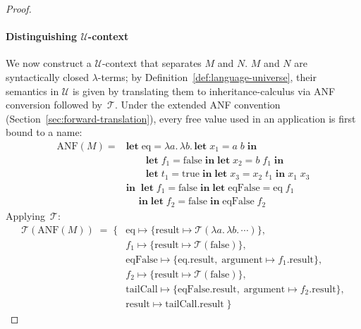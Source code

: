 \begin{proof}
  \paragraph{Distinguishing $\mathscr{U}$-context}
  We now construct a $\mathscr{U}$-context that
  separates $M$ and $N$.
  $M$ and $N$ are syntactically closed $\lambda$-terms;
  by Definition~\ref{def:language-universe}, their
  semantics in $\mathscr{U}$ is given by translating
  them to inheritance-calculus via ANF conversion followed
  by~$\mathcal{T}$.
  Under the extended ANF convention
  (Section~\ref{sec:forward-translation}), every free
  value used in an application is first bound to a name:
  \begin{align*}
    \mathrm{ANF}(M) ={} &
    \mathbf{let}\;\mathrm{eq} =
    \lambda a.\,\lambda b.\,
    \mathbf{let}\; x_1 = a\;b \;\mathbf{in}\; \\
    &\qquad
    \mathbf{let}\; f_1 = \mathrm{false}
    \;\mathbf{in}\;
    \mathbf{let}\; x_2 = b\;f_1 \;\mathbf{in}\; \\
    &\qquad
    \mathbf{let}\; t_1 = \mathrm{true}
    \;\mathbf{in}\;
    \mathbf{let}\; x_3 = x_2\;t_1
    \;\mathbf{in}\;
    x_1\;x_3 \\
    & \mathbf{in}\;\;
    \mathbf{let}\; f_1 = \mathrm{false}
    \;\mathbf{in}\;
    \mathbf{let}\;\mathrm{eqFalse} = \mathrm{eq}\;f_1 \\
    &\quad
    \;\mathbf{in}\;
    \mathbf{let}\; f_2 = \mathrm{false}
    \;\mathbf{in}\;
    \mathrm{eqFalse}\;f_2
  \end{align*}
  Applying~$\mathcal{T}$:
  \begin{align*}
    \mathcal{T}(\mathrm{ANF}(M)) \;=\; \{&
      \mathrm{eq} \mapsto \{\mathrm{result} \mapsto
      \mathcal{T}(\lambda a.\,\lambda b.\,\cdots)\}, \\
      & f_1 \mapsto \{\mathrm{result} \mapsto
      \mathcal{T}(\mathrm{false})\}, \\
      & \mathrm{eqFalse} \mapsto
      \{\mathrm{eq}.\mathrm{result},\;
        \mathrm{argument} \mapsto
      f_1.\mathrm{result}\}, \\
      & f_2 \mapsto \{\mathrm{result} \mapsto
      \mathcal{T}(\mathrm{false})\}, \\
      & \mathrm{tailCall} \mapsto
      \{\mathrm{eqFalse}.\mathrm{result},\;
        \mathrm{argument} \mapsto
      f_2.\mathrm{result}\}, \\
      & \mathrm{result} \mapsto
      \mathrm{tailCall}.\mathrm{result}
    \;\}
  \end{align*}

\end{proof}
